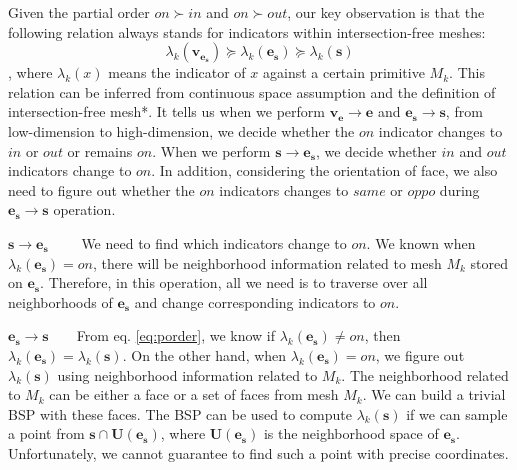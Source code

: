 \documentclass[10pt,journal,compsoc]{IEEEtran}
\begin{document}
Given the partial order $on \succ in$ and $on \succ out$, our key observation is that the following relation always stands for indicators within intersection-free meshes:
\begin{equation}
\label{eq:porder}
\lambda_k(\bm{v}_{\bm{e}_{\bm{s}}}) \succeq \lambda_k(\bm{e}_{\bm{s}}) \succeq \lambda_k(\bm{s})
\end{equation}
, where $\lambda_k(x)$ means the indicator of $x$ against a certain primitive $M_k$. This relation can be inferred from continuous space assumption and the definition of intersection-free mesh*. It tells us when we perform $\bm{v}_{\bm{e}}\to \bm{e}$ and $\bm{e}_{\bm{s}}\to \bm{s}$, from low-dimension to high-dimension, we decide whether the $on$ indicator changes to $in$ or $out$ or remains $on$. When we perform $\bm{s}\to \bm{e}_{\bm{s}}$, we decide whether $in$ and $out$ indicators change to $on$. In addition, considering the orientation of face, we also need to figure out whether the $on$ indicators changes to $same$ or $oppo$ during $\bm{e}_{\bm{s}}\to \bm{s}$ operation.

\vspace{0.5em}
\noindent\textbf{$\bm{s\to \bm{e}_{\bm{s}}}$}~~~~ We need to find which indicators change to $on$. We known when $\lambda_k(\bm{e}_{\bm{s}})=on$, there will be neighborhood information related to mesh $M_k$ stored on $\bm{e}_{\bm{s}}$. Therefore, in this operation, all we need is to traverse over all neighborhoods of $\bm{e}_{\bm{s}}$ and change corresponding indicators to $on$.


\vspace{0.5em}
\noindent\textbf{$\bm{\bm{e}_{\bm{s}}\to \bm{s}}$}~~~~From eq. \ref{eq:porder}, we know if $\lambda_k(\bm{e}_{\bm{s}}) \neq on$, then $\lambda_k(\bm{e}_{\bm{s}})=\lambda_k(\bm{s})$. On the other hand, when $\lambda_k(\bm{e}_{\bm{s}}) = on$, we figure out $\lambda_k(\bm{s})$ using neighborhood information related to $M_k$. The neighborhood related to $M_k$ can be either a face or a set of faces from mesh $M_k$.  We can build a trivial BSP \cite{thibault1987set} with these faces. The BSP can be used to compute $\lambda_k(\bm{s})$ if we can sample a point from $\bm{s} \cap \bm{U}(\bm{e}_{\bm{s}})$, where $\bm{U}(\bm{e}_{\bm{s}})$ is the neighborhood space of $\bm{e}_{\bm{s}}$. Unfortunately, we cannot guarantee to find such a point with precise coordinates.
\end{document}
